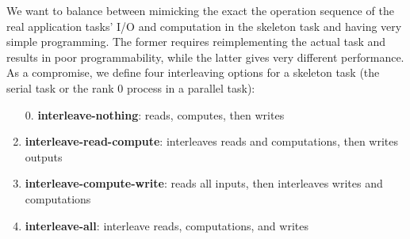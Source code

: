 \documentclass[preprint,12pt]{elsarticle}
\newcommand{\katznote}[1]{ {\textcolor{blue}    { ***Dan:   #1 }}}
\newcommand{\zhaonote}[1]{{\textcolor{cyan}{ ***Zhao:  #1 }}}
\newcommand{\katznote}[1]{}
\newcommand{\zhaonote}[1]{}
\begin{document}
We want to balance between mimicking the exact the operation sequence of the real application tasks' I/O and computation in the skeleton task and having very simple programming.  The former requires reimplementing the actual task and results in poor programmability, while the latter gives very different performance.  As a compromise,
 we define four interleaving options for a skeleton task (the serial task or the rank 0 process in a parallel task): %
\begin{enumerate}
\item[0.] \textbf{interleave-nothing}: reads, computes, then writes
\item{\textbf{interleave-read-compute}:} interleaves reads and computations, then writes outputs
\item{\textbf{interleave-compute-write}:} reads all inputs, then interleaves writes and computations
\item{\textbf{interleave-all}:} interleave reads, computations, and writes
\end{enumerate}


\end{document}
